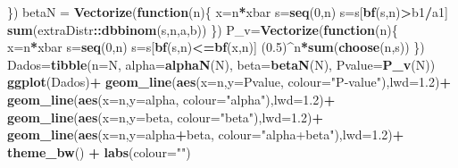 \documentclass[
]{book}
\newenvironment{Shaded}{\begin{snugshade}}{\end{snugshade}}
\newcommand{\ControlFlowTok}[1]{\textcolor[rgb]{0.13,0.29,0.53}{\textbf{#1}}}
\newcommand{\DataTypeTok}[1]{\textcolor[rgb]{0.13,0.29,0.53}{#1}}
\newcommand{\DecValTok}[1]{\textcolor[rgb]{0.00,0.00,0.81}{#1}}
\newcommand{\FloatTok}[1]{\textcolor[rgb]{0.00,0.00,0.81}{#1}}
\newcommand{\KeywordTok}[1]{\textcolor[rgb]{0.13,0.29,0.53}{\textbf{#1}}}
\newcommand{\NormalTok}[1]{#1}
\newcommand{\OperatorTok}[1]{\textcolor[rgb]{0.81,0.36,0.00}{\textbf{#1}}}
\newcommand{\StringTok}[1]{\textcolor[rgb]{0.31,0.60,0.02}{#1}}
\begin{document}
\begin{Shaded}
\begin{Highlighting}[]
\NormalTok{\})}
\NormalTok{betaN =}\StringTok{ }\KeywordTok{Vectorize}\NormalTok{(}\ControlFlowTok{function}\NormalTok{(n)\{}
\NormalTok{  x=n}\OperatorTok{*}\NormalTok{xbar}
\NormalTok{  s=}\KeywordTok{seq}\NormalTok{(}\DecValTok{0}\NormalTok{,n)}
\NormalTok{  s=s[}\KeywordTok{bf}\NormalTok{(s,n)}\OperatorTok{>}\NormalTok{b1}\OperatorTok{/}\NormalTok{a1]}
  \KeywordTok{sum}\NormalTok{(extraDistr}\OperatorTok{::}\KeywordTok{dbbinom}\NormalTok{(s,n,a,b))}
\NormalTok{\})}
\NormalTok{P_v=}\KeywordTok{Vectorize}\NormalTok{(}\ControlFlowTok{function}\NormalTok{(n)\{}
\NormalTok{  x=n}\OperatorTok{*}\NormalTok{xbar}
\NormalTok{  s=}\KeywordTok{seq}\NormalTok{(}\DecValTok{0}\NormalTok{,n)}
\NormalTok{  s=s[}\KeywordTok{bf}\NormalTok{(s,n)}\OperatorTok{<=}\KeywordTok{bf}\NormalTok{(x,n)]}
\NormalTok{  (}\FloatTok{0.5}\NormalTok{)}\OperatorTok{^}\NormalTok{n}\OperatorTok{*}\KeywordTok{sum}\NormalTok{(}\KeywordTok{choose}\NormalTok{(n,s))}
\NormalTok{\})}
\NormalTok{Dados=}\KeywordTok{tibble}\NormalTok{(}\DataTypeTok{n=}\NormalTok{N, }\DataTypeTok{alpha=}\KeywordTok{alphaN}\NormalTok{(N), }\DataTypeTok{beta=}\KeywordTok{betaN}\NormalTok{(N), }\DataTypeTok{Pvalue=}\KeywordTok{P_v}\NormalTok{(N))}
\KeywordTok{ggplot}\NormalTok{(Dados)}\OperatorTok{+}
\StringTok{  }\KeywordTok{geom_line}\NormalTok{(}\KeywordTok{aes}\NormalTok{(}\DataTypeTok{x=}\NormalTok{n,}\DataTypeTok{y=}\NormalTok{Pvalue, }\DataTypeTok{colour=}\StringTok{"P-value"}\NormalTok{),}\DataTypeTok{lwd=}\FloatTok{1.2}\NormalTok{)}\OperatorTok{+}
\StringTok{  }\KeywordTok{geom_line}\NormalTok{(}\KeywordTok{aes}\NormalTok{(}\DataTypeTok{x=}\NormalTok{n,}\DataTypeTok{y=}\NormalTok{alpha, }\DataTypeTok{colour=}\StringTok{"alpha"}\NormalTok{),}\DataTypeTok{lwd=}\FloatTok{1.2}\NormalTok{)}\OperatorTok{+}
\StringTok{  }\KeywordTok{geom_line}\NormalTok{(}\KeywordTok{aes}\NormalTok{(}\DataTypeTok{x=}\NormalTok{n,}\DataTypeTok{y=}\NormalTok{beta, }\DataTypeTok{colour=}\StringTok{"beta"}\NormalTok{),}\DataTypeTok{lwd=}\FloatTok{1.2}\NormalTok{)}\OperatorTok{+}
\StringTok{  }\KeywordTok{geom_line}\NormalTok{(}\KeywordTok{aes}\NormalTok{(}\DataTypeTok{x=}\NormalTok{n,}\DataTypeTok{y=}\NormalTok{alpha}\OperatorTok{+}\NormalTok{beta, }\DataTypeTok{colour=}\StringTok{"alpha+beta"}\NormalTok{),}\DataTypeTok{lwd=}\FloatTok{1.2}\NormalTok{)}\OperatorTok{+}
\StringTok{  }\KeywordTok{theme_bw}\NormalTok{() }\OperatorTok{+}\StringTok{ }\KeywordTok{labs}\NormalTok{(}\DataTypeTok{colour=}\StringTok{""}\NormalTok{)}
\end{Highlighting}
\end{Shaded}
\end{document}
